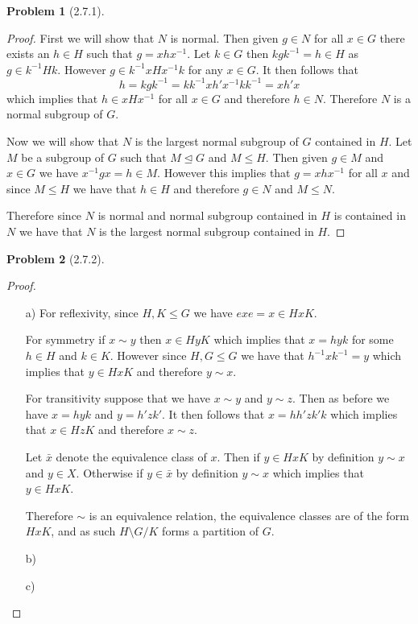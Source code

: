 \documentclass[10pt]{article}
\newcommand{\sk}{\vskip 10mm}
\theoremstyle{plain}
\newtheorem{problem}{Problem}
\theoremstyle{remark}
\begin{document}
\begin{problem}[2.7.1]
  
\end{problem}

\begin{proof}
  First we will show that $N$ is normal. Then given $g\in N$ for all $x\in G$ there
  exists an $h\in H$ such that $g=xhx^{-1}$. Let $k\in G$ then $kgk^{-1}=h\in H$ as
  $g\in k^{-1}Hk$. However $g \in k^{-1}xHx^{-1}k$ for any $x\in G$. It then follows that
  \[ h=kgk^{-1}=kk^{-1}xh'x^{-1}kk^{-1}=xh'x\]
  which implies that $h\in xHx^{-1}$ for all $x\in G$ and therefore $h\in N$.
  Therefore $N$ is a normal subgroup of $G$.

  Now we will show that $N$ is the largest normal subgroup of $G$ contained in $H$.
  Let $M$ be a subgroup of $G$ such that $M\trianglelefteq G$ and $M\leq H$. Then
  given $g\in M$ and $x\in G$ we have $x^{-1}gx=h\in M$. However this implies that
  $g=xhx^{-1}$ for all $x$ and since $M\leq H$ we have that $h\in H$ and therefore
  $g\in N$ and $M\leq N$.

  Therefore since $N$ is normal and normal subgroup contained in $H$ is contained
  in $N$ we have that $N$ is the largest normal subgroup contained in $H$.
\end{proof}

\sk

\begin{problem}[2.7.2]
  
\end{problem}

\begin{proof}
  \begin{itemize}
  \item[a)] For reflexivity, since $H,K\leq G$ we have $exe=x\in HxK$.

    For symmetry if $x\sim y$ then $x\in HyK$ which implies that $x=hyk$ for some $h\in H$ and
    $k\in K$. However since $H,G\leq G$ we have that $h^{-1}xk^{-1}=y$ which implies that
    $y\in HxK$ and therefore $y\sim x$.

    For transitivity suppose that we have $x\sim y$ and $y\sim z$. Then as before we have
    $x=hyk$ and $y=h'zk'$. It then follows that $x=hh'zk'k$ which implies that $x\in HzK$
    and therefore $x\sim z$.

    Let $\bar{x}$ denote the equivalence class of $x$. Then if $y\in HxK$ by definition
    $y\sim x$ and $y\in X$. Otherwise if $y\in \bar{x}$ by definition $y\sim x$ which implies that
    $y\in HxK$.

    Therefore $\sim$ is an equivalence relation, the equivalence classes are
    of the form $HxK$, and as such $H\setminus G/ K$ forms a partition of $G$.
  \item[b)]
  \item[c)]
  \end{itemize}
\end{proof}
\end{document}
